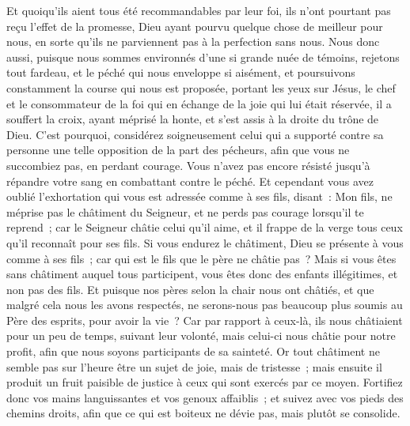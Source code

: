 \begin{multicols}{2}
 Et quoiqu'ils aient tous été recommandables par leur foi, ils n'ont pourtant pas reçu l'effet de la promesse,
Dieu ayant pourvu quelque chose de meilleur pour nous, en sorte qu'ils ne parviennent pas à la perfection sans nous.
\VerseOne{}Nous donc aussi, puisque nous sommes environnés d'une si grande nuée de témoins, rejetons tout fardeau, et le péché qui nous enveloppe si aisément, et poursuivons constamment la course qui nous est proposée,
portant les yeux sur Jésus, le chef et le consommateur de la foi qui en échange de la joie qui lui était réservée, il a souffert la croix, ayant méprisé la honte, et s'est assis à la droite du trône de Dieu.
C'est pourquoi, considérez soigneusement celui qui a supporté contre sa personne une telle opposition de la part des pécheurs, afin que vous ne succombiez pas, en perdant courage.
Vous n'avez pas encore résisté jusqu'à répandre votre sang en combattant contre le péché.
Et cependant vous avez oublié l'exhortation qui vous est adressée comme à ses fils, disant~: Mon fils, ne méprise pas le châtiment du Seigneur, et ne perds pas courage lorsqu'il te reprend~;
car le Seigneur châtie celui qu'il aime, et il frappe de la verge tous ceux qu'il reconnaît pour ses fils.
Si vous endurez le châtiment, Dieu se présente à vous comme à ses fils~; car qui est le fils que le père ne châtie pas~?
Mais si vous êtes sans châtiment auquel tous participent, vous êtes donc des enfants illégitimes, et non pas des fils.
Et puisque nos pères selon la chair nous ont châtiés, et que malgré cela nous les avons respectés, ne serons-nous pas beaucoup plus soumis au Père des esprits, pour avoir la vie~?
Car par rapport à ceux-là, ils nous châtiaient pour un peu de temps, suivant leur volonté, mais celui-ci nous châtie pour notre profit, afin que nous soyons participants de sa sainteté.
Or tout châtiment ne semble pas sur l'heure être un sujet de joie, mais de tristesse~; mais ensuite il produit un fruit paisible de justice à ceux qui sont exercés par ce moyen.
Fortifiez donc vos mains languissantes et vos genoux affaiblis~;
et suivez avec vos pieds des chemins droits, afin que ce qui est boiteux ne dévie pas, mais plutôt se consolide.

\end{multicols}

